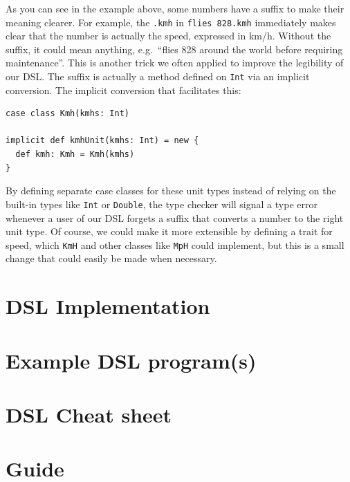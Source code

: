 \documentclass[a4paper]{article}
\newcommand{\cc}[1]{\texttt{#1}}
\renewcommand{\sc}[1]{\lstinline{#1}}
\begin{document}
As you can see in the example above, some numbers have a suffix to make their meaning clearer.
For example, the \sc{.kmh} in \sc{flies 828.kmh} immediately makes clear that the number is actually the speed, expressed in km/h.
Without the suffix, it could mean anything, e.g.\ ``flies 828 around the world before requiring maintenance''.
This is another trick we often applied to improve the legibility of our DSL.
The suffix is actually a method defined on \cc{Int} via an implicit conversion.
The implicit conversion that facilitates this:
\begin{lstlisting}
case class Kmh(kmhs: Int)

implicit def kmhUnit(kmhs: Int) = new {
  def kmh: Kmh = Kmh(kmhs)
}
\end{lstlisting}

By defining separate case classes for these unit types instead of relying on the built-in types like \cc{Int} or \cc{Double}, the type checker will signal a type error whenever a user of our DSL forgets a suffix that converts a number to the right unit type.
Of course, we could make it more extensible by defining a trait for speed, which \cc{KmH} and other classes like \cc{MpH} could implement, but this is a small change that could easily be made when necessary.



\section{DSL Implementation}
\label{sec:dsl-implementation}


\section{Example DSL program(s)}
\label{sec:example-dsl-programs}


\section{DSL Cheat sheet}
\label{sec: cheat-sheet}



\section{Guide}
\label{sec:guide}

\end{document}
